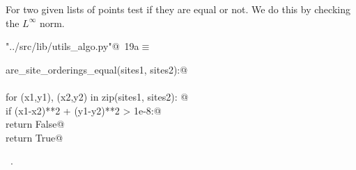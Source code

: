 \documentclass[11.5pt]{report}
\begin{document}
\vspace{-0.8cm}
\newchunk For two given lists of points test if they are 
equal or not. We do this by checking the $L^{\infty}$ norm.
\begin{flushleft} \small
\begin{minipage}{\linewidth}\label{scrap17}\raggedright\small
{} \verb@"../src/lib/utils_algo.py"@\nobreak\ {\footnotesize {19a}}$\equiv$
\vspace{-1ex}
\begin{list}{}{} \item
\mbox{}\verb@def are_site_orderings_equal(sites1, sites2):@\\
\mbox{}\verb@@\\
\mbox{}\verb@    for (x1,y1), (x2,y2) in zip(sites1, sites2): @\\
\mbox{}\verb@        if (x1-x2)**2 + (y1-y2)**2 > 1e-8:@\\
\mbox{}\verb@            return False@\\
\mbox{}\verb@    return True@\\
\mbox{}\verb@@{\NWsep}
\end{list}
\vspace{-1.5ex}
\footnotesize
\begin{list}{}{\setlength{\itemsep}{-\parsep}\setlength{\itemindent}{-\leftmargin}}
\item \NWtxtFileDefBy\ .

\item{}
\end{list}
\end{minipage}\vspace{4ex}
\end{flushleft}
\end{document}
